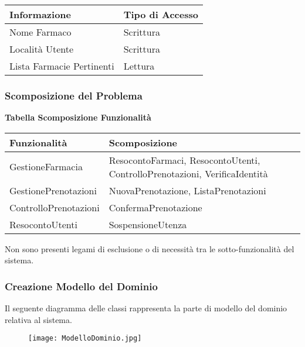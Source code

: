 \begin{tabular} {|P{7cm}|P{7cm}|}
    \hline
    \textbf{Informazione}     & \textbf{Tipo di Accesso} \\
    \hline
    Nome Farmaco              & Scrittura                \\
    \hline
    Località Utente           & Scrittura                \\
    \hline
    Lista Farmacie Pertinenti & Lettura                  \\
    \hline
\end{tabular}
\hfill \break
\hfill \break

\subsubsection{Scomposizione del Problema}
\hfill \break

\textbf{Tabella Scomposizione Funzionalità}
\hfill \break

\begin{tabular} {|P{7cm}|P{7cm}|}
    \hline
    \textbf{Funzionalità} & \textbf{Scomposizione}                                                     \\
    \hline
    GestioneFarmacia      & ResocontoFarmaci, ResocontoUtenti, ControlloPrenotazioni, VerificaIdentità \\
    \hline
    GestionePrenotazioni  & NuovaPrenotazione, ListaPrenotazioni                                       \\
    \hline
    ControlloPrenotazioni & ConfermaPrenotazione                                                       \\
    \hline
    ResocontoUtenti       & SospensioneUtenza                                                          \\
    \hline
\end{tabular}
\hfill \break

Non sono presenti legami di esclusione o di necessità tra le sotto-funzionalità del sistema.

\newpage
\subsubsection{Creazione Modello del Dominio}

Il seguente diagramma delle classi rappresenta la parte di modello del dominio relativa al sistema. \\

\begin{figure}[h!]
    \begin{center}
        \texttt{[image: ModelloDominio.jpg]}
    \end{center}
\end{figure}
\hfill \break

